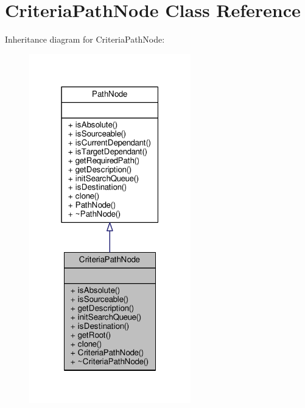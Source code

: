 \hypertarget{classCriteriaPathNode}{}\section{Criteria\+Path\+Node Class Reference}
\label{classCriteriaPathNode}


Inheritance diagram for Criteria\+Path\+Node\+:
\nopagebreak
\begin{figure}[H]
\begin{center}
\leavevmode
\includegraphics[width=199pt]{dc/dcf/classCriteriaPathNode__inherit__graph}
\end{center}
\end{figure}


